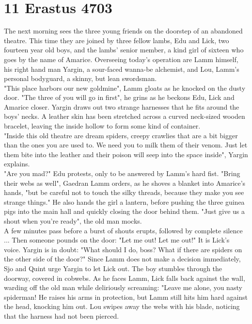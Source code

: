 \section{11 Erastus 4703}

The next morning sees the three young friends on the doorstep of an abandoned theatre. This time they are joined by three fellow lambs, Edu and Lick, two fourteen year old boys, and the lambs' senior member, a kind girl of sixteen who goes by the name of Amarice. Overseeing today's operation are Lamm himself, his right hand man Yargin, a sour-faced wanna-be alchemist, and Lou, Lamm's personal bodyguard, a skinny, but lean swordsman.\\

"This place harbors our new goldmine", Lamm gloats as he knocked on the dusty door. "The three of you will go in first", he grins as he beckons Edu, Lick and Amarice closer. Yargin draws out two strange harnesses that he fits around the boys' necks. A leather skin has been stretched across a curved neck-sized wooden bracelet, leaving the inside hollow to form some kind of container.\\

"Inside this old theatre are dream spiders, creepy crawlies that are a bit bigger than the ones you are used to. We need you to milk them of their venom. Just let them bite into the leather and their poison will seep into the space inside", Yargin explains.\\

"Are you mad?" Edu protests, only to be answered by Lamm's hard fist. "Bring their webs as well", Gaedran Lamm orders, as he shoves a blanket into Amarice's hands, "but be careful not to touch the silky threads, because they make you see strange things." He also hands the girl a lantern, before pushing the three guinea pigs into the main hall and quickly closing the door behind them. "Just give us a shout when you're ready", the old man mocks.\\

A few minutes pass before a burst of shouts erupts, followed by complete silence ... Then someone pounds on the door: "Let me out! Let me out!" It is Lick's voice. Yargin is in doubt: "What should I do, boss? What if there are spiders on the other side of the door?" Since Lamm does not make a decision immediately, Sjo and Quint urge Yargin to let Lick out. The boy stumbles through the doorway, covered in cobwebs. As he faces Lamm, Lick falls back against the wall, warding off the old man while deliriously screaming: "Leave me alone, you nasty spiderman! He raises his arms in protection, but Lamm still hits him hard against the head, knocking him out. Lou swipes away the webs with his blade, noticing that the harness had not been pierced.\\

